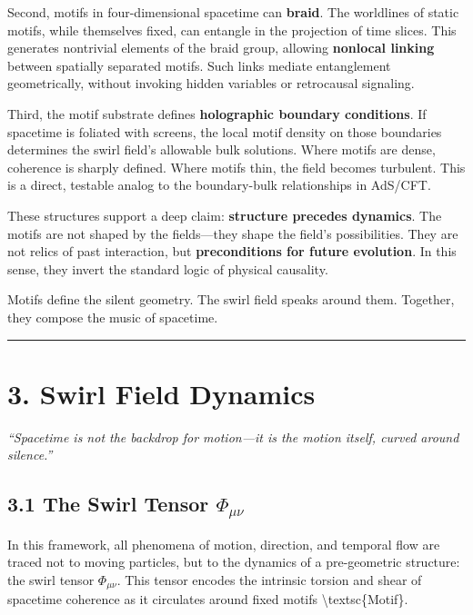 \documentclass[
  11pt,
]{article}
\begin{document}
Second, motifs in four-dimensional spacetime can \textbf{braid}. The
worldlines of static motifs, while themselves fixed, can entangle in the
projection of time slices. This generates nontrivial elements of the
braid group, allowing \textbf{nonlocal linking} between spatially
separated motifs. Such links mediate entanglement geometrically, without
invoking hidden variables or retrocausal signaling.

Third, the motif substrate defines \textbf{holographic boundary
conditions}. If spacetime is foliated with screens, the local motif
density on those boundaries determines the swirl field's allowable bulk
solutions. Where motifs are dense, coherence is sharply defined. Where
motifs thin, the field becomes turbulent. This is a direct, testable
analog to the boundary-bulk relationships in AdS/CFT.

These structures support a deep claim: \textbf{structure precedes
dynamics}. The motifs are not shaped by the fields---they shape the
field's possibilities. They are not relics of past interaction, but
\textbf{preconditions for future evolution}. In this sense, they invert
the standard logic of physical causality.

Motifs define the silent geometry. The swirl field speaks around them.
Together, they compose the music of spacetime.

\begin{center}\rule{0.5\linewidth}{0.5pt}\end{center}

\section{3. Swirl Field Dynamics}\label{swirl-field-dynamics}

\emph{``Spacetime is not the backdrop for motion---it is the motion
itself, curved around silence.''}

\subsection{\texorpdfstring{3.1 The Swirl Tensor
\(\Phi_{\mu\nu}\)}{3.1 The Swirl Tensor \textbackslash Phi\_\{\textbackslash mu\textbackslash nu\}}}\label{the-swirl-tensor-phi_munu}

In this framework, all phenomena of motion, direction, and temporal flow
are traced not to moving particles, but to the dynamics of a
pre-geometric structure: the swirl tensor \(\Phi_{\mu\nu}\). This tensor
encodes the intrinsic torsion and shear of spacetime coherence as it
circulates around fixed motifs \textbackslash textsc\{Motif\}.
\end{document}

